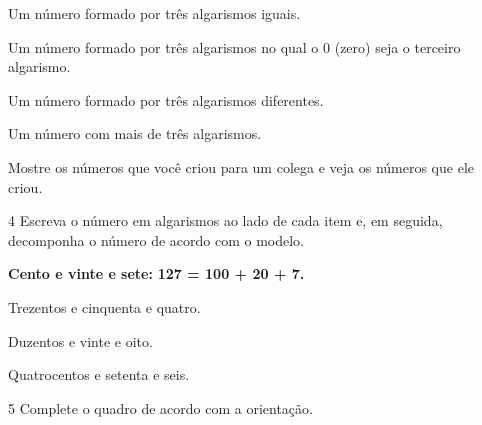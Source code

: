 \begin{escolha}
\item Um número formado por três algarismos iguais.\\

\item Um número formado por três algarismos no qual o 0 (zero) seja o terceiro algarismo.\\

\item Um número formado por três algarismos diferentes.\\

\item Um número com mais de três algarismos.\\

\item Mostre os números que você criou para um colega e veja os números que ele criou.
\end{escolha}

\num{4} Escreva o número em algarismos ao lado de cada item e, em seguida, decomponha o número de acordo com o modelo.

\begin{myquote}
\begin{center}
\textbf{Cento e vinte e sete:} \textbf{127 = 100 + 20 + 7.}
\end{center}
\end{myquote}

\begin{escolha}
\item Trezentos e cinquenta e quatro.

\item Duzentos e vinte e oito.

\item Quatrocentos e setenta e seis.
\end{escolha}

\num{5} Complete o quadro de acordo com a orientação.\bigskip

